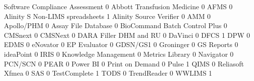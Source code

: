 \documentclass{article}
\begin{document}
\begin{Schunk}
\begin{Soutput}
                                  Software Compliance Assessment
                                                               0
  Abbott Transfusion Medicine                                  0
  AFMS                                                         0
  Alinity S Non-LIMS spreadsheets                              1
  Alinity Source Verifier                                      0
  AMM                                                          0
  Apollo/PHM                                                   0
  Assay File Database                                          0
  BioCommand Batch Control Plus                                0
  CMSnext                                                      0
  CMSNext                                                      0
  DARA Filler DHM and RU                                       0
  DaVinci                                                      0
  DFCS                                                         1
  DPW                                                          0
  EDMS                                                         0
  eNovator                                                     0
  EP Evaluator                                                 0
  GDSN/GS1                                                     0
  Groninger                                                    0
  GS Reports                                                   0
  ideaPoint                                                    0
  IRIS                                                         0
  Knowledge Management                                         0
  Metrics Library                                              0
  Navigator                                                    0
  PCN/SCN                                                      0
  PEAR                                                         0
  Power BI                                                     0
  Print on Demand                                              0
  Pulse                                                        1
  QIMS                                                         0
  Reliasoft Xfmea                                              0
  SAS                                                          0
  TestComplete                                                 1
  TODS                                                         0
  TrendReader                                                  0
  WWLIMS                                                       1
                                 

\end{Soutput}
\end{Schunk}
\end{document}
